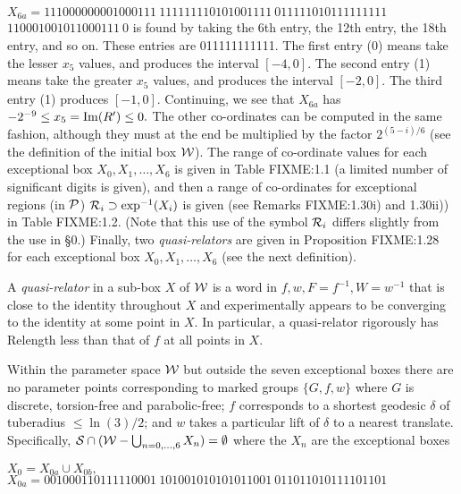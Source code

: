 \noindent 
$X_{6a} = 
111000000001000111\ 
111111110101001111\ 
011111010111111111$\hfill
{}
  \hfill $  
110001001011000111\ 0$
\vglue4pt\noindent 
is found by taking the 6th entry, the 12th entry, the 18th entry, and so on.  These entries are 011111111111.  The first entry (0) means take the
lesser $x_5$ values, and produces the interval $[-4,0].$  The second entry (1) means take the greater $x_5$ values, and produces the interval
$[-2,0].$  The third entry (1) produces $[-1,0].$  Continuing, we see that $X_{6a}^{\phantom{|}}$ has $-2^{-9} \le x_5 = {\rm Im}(R') \le 0.$  The other
co-ordinates can be computed in the same fashion, although they must at the end be multiplied by the factor $2^{(5 - i)/6}$ (see the definition of the
initial box
${\cal W}$).  The range of co-ordinate values for each  exceptional  box $X_0, X_1, \ldots, X_6$ is given in Table FIXME:1.1 (a limited number of significant
digits is given), and  then a range of co-ordinates for exceptional regions (in ${\cal P}$) 
${\cal R}_i \supset \exp^{-1}(X_i)$ is given (see Remarks FIXME:1.30i) and 1.30ii)) in Table FIXME:1.2. (Note that this use of the symbol ${\cal R}_i$ differs
slightly from the use in \S 0.)
Finally, two {\it quasi-relators} are given in Proposition FIXME:1.28 for each exceptional box $X_0, X_1, \ldots, X_6$ (see the next definition).
 

 A {\it quasi-relator} in a sub-box $X$ of ${\cal W}$ is a word in $f,w,F=f^{-1},W=w^{-1}$ that is close to the identity
throughout
$X$ and experimentally appears to be converging to the identity at some point in $X.$  In particular, a quasi-relator rigorously has Relength less than
that of $f$ at all points in $X.$
\enddemo

Within the parameter space ${\cal W}$ but outside the seven exceptional boxes there are no parameter points corresponding to 
marked groups $\{G,f,w\}$ where $G$ is 
discrete{\rm ,} torsion\/{\rm -}\/free and  parabolic\/{\rm -}\/free\/{\rm ; }
$f$ corresponds to a shortest geodesic $\delta$ of tuberadius $\le
\ln(3)/2${\rm ;} and $w$ takes a particular lift of $\delta$ to 
a nearest translate.
 Specifically{\rm ,} 
${\cal S} \cap ({\cal W} - \bigcup_{n = 0,\dots, 6} X_n)=\emptyset$ where the $X_n$ are the exceptional boxes

\vglue4pt

 \noindent $X_0 = X_{0a} \cup X_{0b},$
\noindent $X_{0a} = 
001000110111110001\ 
101001010101011001\ 
011011010111101101$\hfill 

